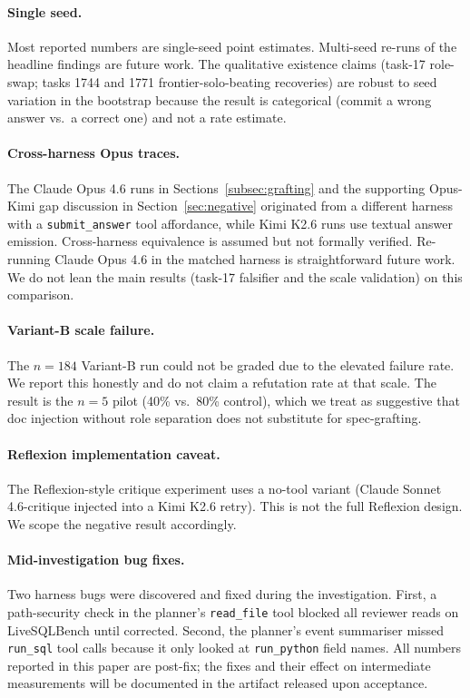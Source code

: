 \documentclass[conference]{IEEEtran}
\newcommand{\Kimi}{Kimi K2.6}
\newcommand{\Opus}{Claude Opus 4.6}
\newcommand{\Sonnet}{Claude Sonnet 4.6}
\begin{document}
\paragraph{Single seed.}
Most reported numbers are single-seed point estimates. Multi-seed re-runs of the headline findings are future work. The qualitative existence claims (task-17 role-swap; tasks 1744 and 1771 frontier-solo-beating recoveries) are robust to seed variation in the bootstrap because the result is categorical (commit a wrong answer vs.\ a correct one) and not a rate estimate.

\paragraph{Cross-harness Opus traces.}
The \Opus{} runs in Sections~\ref{subsec:grafting} and the supporting Opus-Kimi gap discussion in Section~\ref{sec:negative} originated from a different harness with a \texttt{submit\_answer} tool affordance, while \Kimi{} runs use textual answer emission. Cross-harness equivalence is assumed but not formally verified. Re-running \Opus{} in the matched harness is straightforward future work. We do not lean the main results (task-17 falsifier and the scale validation) on this comparison.

\paragraph{Variant-B scale failure.}
The $n=184$ Variant-B run could not be graded due to the elevated failure rate. We report this honestly and do not claim a refutation rate at that scale. The result is the $n=5$ pilot (40\% vs.\ 80\% control), which we treat as suggestive that doc injection without role separation does not substitute for spec-grafting.

\paragraph{Reflexion implementation caveat.}
The Reflexion-style critique experiment uses a no-tool variant (\Sonnet{}-critique injected into a \Kimi{} retry). This is not the full Reflexion design. We scope the negative result accordingly.

\paragraph{Mid-investigation bug fixes.}
Two harness bugs were discovered and fixed during the investigation. First, a path-security check in the planner's \texttt{read\_file} tool blocked all reviewer reads on LiveSQLBench until corrected. Second, the planner's event summariser missed \texttt{run\_sql} tool calls because it only looked at \texttt{run\_python} field names. All numbers reported in this paper are post-fix; the fixes and their effect on intermediate measurements will be documented in the artifact released upon acceptance.
\end{document}
